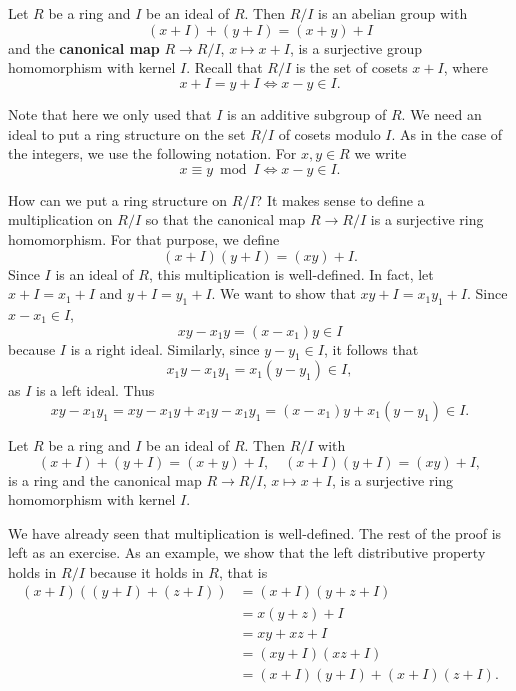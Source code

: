 \chapter{}

Let $R$ be a ring and $I$ be an ideal of $R$. 
Then $R/I$ is an abelian group
with 
\[
(x+I)+(y+I)=(x+y)+I
\]
and the 
\textbf{canonical map} 
$R\to R/I$, $x\mapsto x+I$,
is a surjective group homomorphism with kernel $I$. Recall that 
$R/I$ is the set of cosets $x+I$, where 
\[
x+I=y+I\Longleftrightarrow x-y\in I.
\]

Note that here we only used
that $I$ is an additive subgroup of $R$. We need an ideal to put a ring structure
on the set $R/I$ of cosets modulo $I$. As in the case of the integers, 
we use the following notation. For $x,y\in R$ 
we write 
\[
x\equiv y\bmod I\Longleftrightarrow x-y\in I.
\]

How can we put a ring structure on $R/I$? It makes sense
to define a multiplication on $R/I$ so that
the canonical map $R\to R/I$ is a surjective ring homomorphism. For that purpose, 
we define 
\[
(x+I)(y+I)=(xy)+I.
\]
Since $I$ is an ideal of $R$, this multiplication is well-defined. In fact, let 
$x+I=x_1+I$ and $y+I=y_1+I$. We want to show that
$xy+I=x_1y_1+I$. Since $x-x_1\in I$, 
\[
xy-x_1y=(x-x_1)y\in I
\]
because $I$ is a right ideal. Similarly, since $y-y_1\in I$, it follows that 
\[
x_1y-x_1y_1=x_1(y-y_1)\in I,
\]
as $I$ is a left ideal. Thus
\[
xy-x_1y_1=xy-x_1y+x_1y-x_1y_1=(x-x_1)y+x_1(y-y_1)\in I.
\]

\begin{theorem}
\label{thm:quotient_ring}
	Let $R$ be a ring and $I$ be an ideal of $R$. Then
	$R/I$ with 
	\[
	(x+I)+(y+I)=(x+y)+I,\quad
	(x+I)(y+I)=(xy)+I,
	\]
	is a ring and the canonical map $R\to R/I$, $x\mapsto x+I$, 
	is a surjective
	ring homomorphism with kernel $I$. 
\end{theorem}

We have already seen that multiplication is well-defined. 
The rest of the proof is left as an exercise. As an example, we show that 
the left distributive property holds
in $R/I$ because it holds in $R$, that is 
\begin{align*}
    (x+I)\left((y+I)+(z+I)\right) &= (x+I)(y+z+I)\\
    &=x(y+z)+I\\
    &=xy+xz+I\\
    &=(xy+I)(xz+I)\\
    &=(x+I)(y+I)+(x+I)(z+I).
\end{align*}

